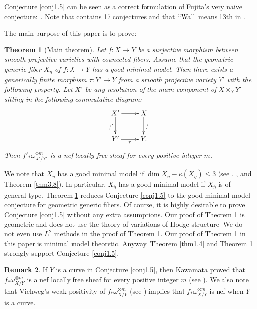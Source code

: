 \documentclass[12pt,twoside]{amsart}
\newtheorem{thm}{Theorem}[section]
\theoremstyle{definition}
\newtheorem{rem}[thm]{Remark}
\begin{document}
Conjecture \ref{conj1.5} can be seen as a correct formulation of 
Fujita's very naive conjecture:~\cite[Conjecture Wa$_m$]{fujita}. 
Note that \cite{fujita} contains 17 conjectures and 
that \lq\lq Wa\rq\rq\ means 13th in \cite{fujita}.  

The main purpose of this paper is to prove: 

\begin{thm}[Main theorem]\label{thm1.6}
Let $f:X\to Y$ be a surjective morphism between 
smooth projective varieties with connected fibers. 
Assume that the geometric generic fiber $X_{\overline \eta}$ of $f:X\to Y$ 
has a good minimal model. 
Then there exists a generically finite morphism 
$\tau:Y'\to Y$ from a smooth projective variety $Y'$ 
with the following property. 
Let $X'$ be any resolution of the main component of $X\times _Y Y'$ 
sitting in the following commutative diagram:  
$$
\xymatrix{X' \ar[r]\ar[d]_{f'}& X\ar[d]^f\\
Y'\ar[r]_{\tau} &Y. 
}
$$ 
Then $f'_*\omega^{\otimes m}_{X'/Y'}$ is a nef 
locally free sheaf for every positive integer $m$. 
\end{thm}

We note that $X_{\overline \eta}$ has a good minimal model 
if $\dim X_{\overline \eta}-\kappa (X_{\overline \eta})\leq 3$ 
(see \cite{bchm}, \cite{lai}, and Theorem \ref{thm3.8}). 
In particular, $X_{\overline \eta}$ has 
a good minimal model if $X_{\overline \eta}$ is of general type. 
Theorem \ref{thm1.6} reduces Conjecture \ref{conj1.5} to 
the good minimal model conjecture for geometric 
generic fibers. 
Of course, it is highly desirable to prove Conjecture \ref{conj1.5} 
without any extra assumptions. 
Our proof of 
Theorem \ref{thm1.6} is geometric and 
does not use the theory of variations of Hodge structure. 
We do not even use $L^2$ methods in the proof of Theorem \ref{thm1.6}. 
Our proof of Theorem \ref{thm1.6} in this paper is minimal model theoretic. 
Anyway, Theorem \ref{thm1.4} and Theorem \ref{thm1.6} strongly support 
Conjecture \ref{conj1.5}. 

\begin{rem}
If $Y$ is a curve in Conjecture \ref{conj1.5}, 
then Kawamata proved that 
$f_*\omega^{\otimes m}_{X/Y}$ is a nef locally free sheaf 
for every positive integer $m$  
(see \cite[Theorem 1]{kawamata2}). 
We also note that Viehweg's weak positivity 
of $f_*\omega^{\otimes m}_{X/Y}$ (see \cite[Theorem III]{viehweg}) 
implies that $f_*\omega^{\otimes m}_{X/Y}$ is 
nef when $Y$ is a curve. 
\end{rem}
\end{document}
